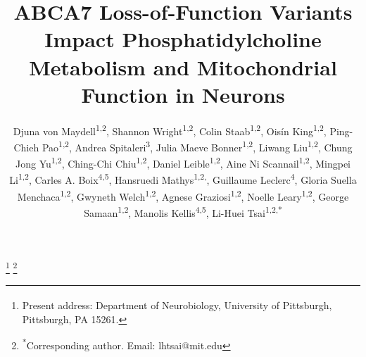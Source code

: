 \documentclass[12pt]{article}
\begin{document}
\onehalfspacing




\title{ABCA7 Loss-of-Function Variants Impact Phosphatidylcholine Metabolism and Mitochondrial Function in Neurons}

\author{\parbox{\textwidth}{Djuna von Maydell\textsuperscript{1,2}, 
    Shannon Wright\textsuperscript{1,2}, 
    Colin Staab\textsuperscript{1,2}, 
    Ois\'{i}n King\textsuperscript{1,2}, 
    Ping-Chieh Pao\textsuperscript{1,2}, 
    Andrea Spitaleri\textsuperscript{3}, 
    Julia Maeve Bonner\textsuperscript{1,2}, 
    Liwang Liu\textsuperscript{1,2}, 
    Chung Jong Yu\textsuperscript{1,2}, 
    Ching-Chi Chiu\textsuperscript{1,2}, 
    Daniel Leible\textsuperscript{1,2}, 
    Aine Ni Scannail\textsuperscript{1,2}, 
    Mingpei Li\textsuperscript{1,2}, 
    Carles A. Boix\textsuperscript{4,5}, 
    Hansruedi Mathys\textsuperscript{1,2,\textdaggerdbl}, 
    Guillaume Leclerc\textsuperscript{4}, 
    Gloria Suella Menchaca\textsuperscript{1,2}, 
    Gwyneth Welch\textsuperscript{1,2}, 
    Agnese Graziosi\textsuperscript{1,2}, 
    Noelle Leary\textsuperscript{1,2}, 
    George Samaan\textsuperscript{1,2}, 
    Manolis Kellis\textsuperscript{4,5}, 
    Li-Huei Tsai\textsuperscript{1,2,*}
  }}

\date{}
\maketitle


\thanks{\textsuperscript{\textdaggerdbl}Present address: Department of Neurobiology, University of Pittsburgh, Pittsburgh, PA 15261.}
\thanks{\textsuperscript{*}Corresponding author. Email: lhtsai@mit.edu}
\end{document}
